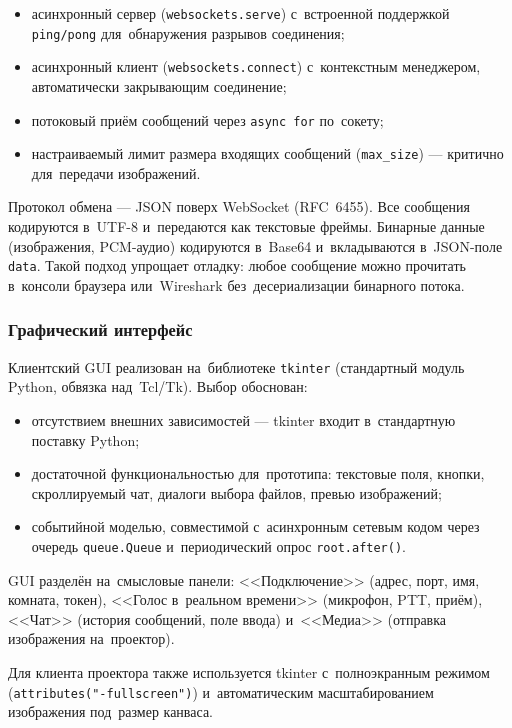 \begin{itemize}
  \item асинхронный сервер (\texttt{websockets.serve}) с~встроенной поддержкой \texttt{ping/pong} для~обнаружения разрывов соединения;
  \item асинхронный клиент (\texttt{websockets.connect}) с~контекстным менеджером, автоматически закрывающим соединение;
  \item потоковый приём сообщений через \texttt{async for} по~сокету;
  \item настраиваемый лимит размера входящих сообщений (\texttt{max\_size}) — критично для~передачи изображений.
\end{itemize}

Протокол обмена --- JSON поверх WebSocket (RFC~6455). Все сообщения кодируются в~UTF-8 и~передаются как текстовые фреймы. Бинарные данные (изображения, PCM-аудио) кодируются в~Base64 и~вкладываются в~JSON-поле \texttt{data}. Такой подход упрощает отладку: любое сообщение можно прочитать в~консоли браузера или~Wireshark без~десериализации бинарного потока.

\subsubsection{Графический интерфейс}

Клиентский GUI реализован на~библиотеке \texttt{tkinter} (стандартный модуль Python, обвязка над~Tcl/Tk). Выбор обоснован:

\begin{itemize}
  \item отсутствием внешних зависимостей --- tkinter входит в~стандартную поставку Python;
  \item достаточной функциональностью для~прототипа: текстовые поля, кнопки, скроллируемый чат, диалоги выбора файлов, превью изображений;
  \item событийной моделью, совместимой с~асинхронным сетевым кодом через очередь \texttt{queue.Queue} и~периодический опрос \texttt{root.after()}.
\end{itemize}

GUI разделён на~смысловые панели: <<Подключение>> (адрес, порт, имя, комната, токен), <<Голос в~реальном времени>> (микрофон, PTT, приём), <<Чат>> (история сообщений, поле ввода) и~<<Медиа>> (отправка изображения на~проектор).

Для клиента проектора также используется tkinter с~полноэкранным режимом (\texttt{attributes("-fullscreen")}) и~автоматическим масштабированием изображения под~размер канваса.


